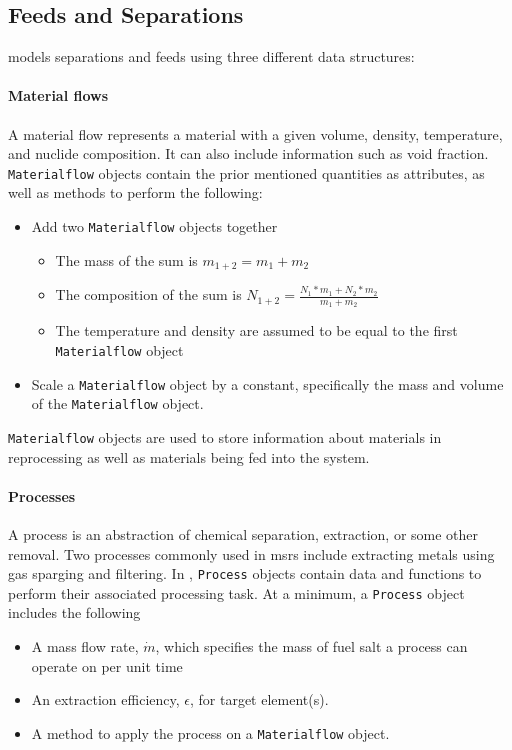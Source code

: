 \subsection{Feeds and Separations}
\label{sub:feeds-separations}
\SaltProc models separations and feeds using three different data structures:

\paragraph{Material flows}
    A material flow represents a material with a given
    volume, density, temperature, and nuclide composition.
    It can also include information such as void fraction. \verb.Materialflow.
    objects contain the prior mentioned quantities as attributes, as well as
    methods to perform the following:
    \begin{itemize}
        \item Add two \verb.Materialflow. objects together
            \begin{itemize}
                \item The mass of the sum is $m_{1+2} = m_{1} + m_{2}$
                \item The composition of the sum is $N_{1+2} = \frac{N_{1} * m_{1} + N_{2} * m_{2}}{m_{1} + m_{2}}$
                \item The temperature and density are assumed to be equal to the
                    first \verb.Materialflow. object
            \end{itemize}
        \item Scale a \verb.Materialflow. object by a constant, specifically
            the mass and volume of the \verb.Materialflow. object.
    \end{itemize}
    \verb.Materialflow. objects are used to store information about materials
    in reprocessing as well as materials being fed into the system.

\paragraph{Processes}
    A process is an abstraction of chemical separation, extraction, or some
    other removal. Two processes commonly used in \Gls{msr}s include
    extracting metals using gas sparging and filtering. In \SaltProc,
    \verb.Process. objects contain data and functions to perform their
    associated processing task. At a minimum, a \verb.Process. object includes
    the following
    \begin{itemize}
        \item A mass flow rate, $\dot{m}$, which specifies the mass of fuel salt a process can operate on per unit time
        \item An extraction efficiency, $\epsilon$, for target element(s).
        \item A method to apply the process on a \verb.Materialflow. object. 
    \end{itemize}

